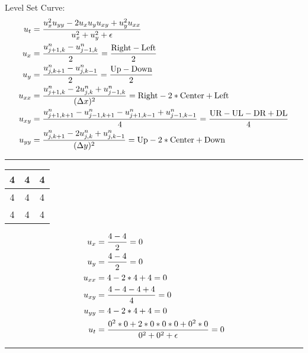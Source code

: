 \item Level Set Curve:
%
\begin{align}
  u_t & = \frac
  {u^2_x u_{yy} - 2 u_x u_y u_{xy} + u^2_y u_{xx}}
  {u^2_x + u^2_y + \epsilon}\\
  u_x & = \frac
  {u^n_{j+1, k} - u^n_{j-1, k}}{2} = \frac{\text{Right} - \text{Left}}{2}\\
  u_y & = \frac
  {u^n_{j, k+1} - u^n_{j, k-1}}{2} = \frac{\text{Up} - \text{Down}}{2}\\
  u_{xx} & = \frac
  {u^n_{j+1, k} - 2u^n_{j, k} + u^n_{j-1, k}}{(\Delta x)^2}
  = \text{Right} - 2 * \text{Center} + \text{Left}\\
  u_{xy} & = \frac
  {u^n_{j+1, k+1} - u^n_{j-1, k+1} - u^n_{j+1, k-1} + u^n_{j-1, k-1}}{4}
  = \frac{\text{UR} - \text{UL} - \text{DR} + \text{DL}}{4}\\
  u_{yy} & = \frac
  {u^n_{j, k+1} - 2u^n_{j, k} + u^n_{j, k-1}}{(\Delta y)^2}
  = \text{Up} - 2 * \text{Center} + \text{Down}
\end{align}

\hrule

\begin{center}
  \begin{tabular}{c|c|c}
    4 & 4 & 4\\
    \hline
    4 & 4 & 4\\
    \hline
    4 & 4 & 4
  \end{tabular}
\end{center}

\begin{align}
  u_{x} & = \frac{4 - 4}{2} = 0\\
  u_{y} & = \frac{4 - 4}{2} = 0\\
  u_{xx} & = 4 - 2*4 + 4 = 0\\
  u_{xy} & = \frac{4 - 4 - 4 + 4}{4} = 0\\
  u_{yy} & = 4 - 2*4 + 4 = 0\\
  u_t & = \frac{0^2 * 0 + 2*0*0*0 + 0^2 * 0}{0^2 + 0^2 + \epsilon} = 0
\end{align}

\hrule

